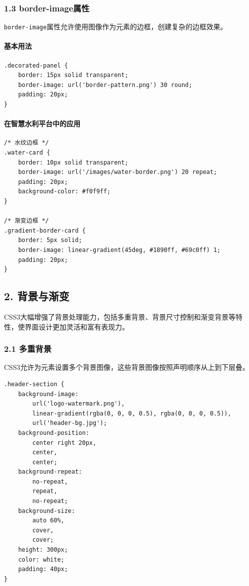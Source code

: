 \subsubsection{1.3 border-image属性}\label{border-imageux5c5eux6027}

\passthrough{\lstinline!border-image!}属性允许使用图像作为元素的边框，创建复杂的边框效果。

\paragraph{基本用法}\label{ux57faux672cux7528ux6cd5-2}

\begin{lstlisting}
.decorated-panel {
    border: 15px solid transparent;
    border-image: url('border-pattern.png') 30 round;
    padding: 20px;
}
\end{lstlisting}

\paragraph{在智慧水利平台中的应用}\label{ux5728ux667aux6167ux6c34ux5229ux5e73ux53f0ux4e2dux7684ux5e94ux7528-2}

\begin{lstlisting}
/* 水纹边框 */
.water-card {
    border: 10px solid transparent;
    border-image: url('/images/water-border.png') 20 repeat;
    padding: 20px;
    background-color: #f0f9ff;
}

/* 渐变边框 */
.gradient-border-card {
    border: 5px solid;
    border-image: linear-gradient(45deg, #1890ff, #69c0ff) 1;
    padding: 20px;
}
\end{lstlisting}

\subsection{2. 背景与渐变}\label{ux80ccux666fux4e0eux6e10ux53d8}

CSS3大幅增强了背景处理能力，包括多重背景、背景尺寸控制和渐变背景等特性，使界面设计更加灵活和富有表现力。

\subsubsection{2.1 多重背景}\label{ux591aux91cdux80ccux666f}

CSS3允许为元素设置多个背景图像，这些背景图像按照声明顺序从上到下层叠。

\begin{lstlisting}
.header-section {
    background-image: 
        url('logo-watermark.png'),
        linear-gradient(rgba(0, 0, 0, 0.5), rgba(0, 0, 0, 0.5)),
        url('header-bg.jpg');
    background-position: 
        center right 20px,
        center,
        center;
    background-repeat: 
        no-repeat,
        repeat,
        no-repeat;
    background-size: 
        auto 60%,
        cover,
        cover;
    height: 300px;
    color: white;
    padding: 40px;
}
\end{lstlisting}

